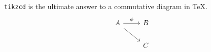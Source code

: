 \documentclass[12pt]{amsart}
\theoremstyle{plain}
\theoremstyle{definition}
\theoremstyle{remark}
\numberwithin{equation}{section} %
\begin{document}
\verb|tikzcd| is the ultimate answer to a commutative diagram in \TeX.
\[ \begin{tikzcd}
		A \arrow[rd] \arrow[r, "\phi"] & B \\
		& C
	\end{tikzcd}  \]


\label{sec:ref}

%	
%		
\end{document}
